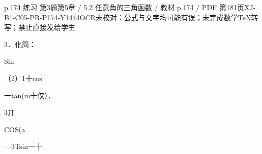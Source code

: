 \begin{bankitem}{p.174 练习 第3题}{第5章 / 5.2 任意角的三角函数 / 教材 p.174 / PDF 第181页}{XJ-B1-C05-PR-P174-Y1444}{OCR未校对：公式与文字均可能有误；未完成数学TeX转写；禁止直接发给学生}
\begin{ocrdraft}
\par
3．化简：
\par
Sln
\par
（2）1十cos
\par
一tan(m十仅）．
\par
3丌
\par
COS(a
\par
—3Tsin一十
\end{ocrdraft}
\end{bankitem}
